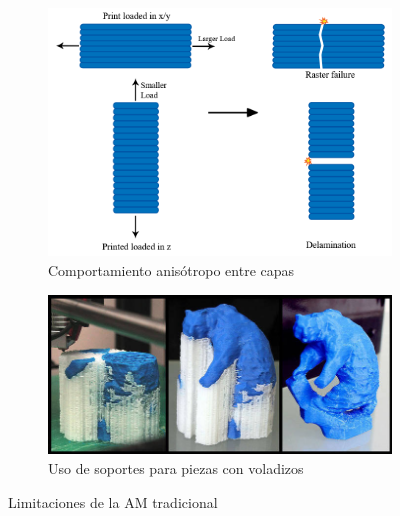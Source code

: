    \begin{figure}[h!]
        \begin{subfigure}[h!]{0.45\linewidth} 
            \centering
            \includegraphics[scale=0.25]{figuras/comportamiento_anisotropo3.png}
            \caption{Comportamiento anisótropo entre capas\cite{web_fdm_properties}}
            \label{fig:comportamiento_anisotropo3}
        \end{subfigure}
        \begin{subfigure}[h!]{0.45\linewidth} 
            \centering
            \includegraphics[scale=0.25]{figuras/fdm_soporte_desventaja.jpg}
            \caption{Uso de soportes para piezas con voladizos}
            \label{fig:fdm_soporte_desventaja}
        \end{subfigure}
        \caption{Limitaciones de la \acrshort{AM} tradicional}
    \end{figure}


